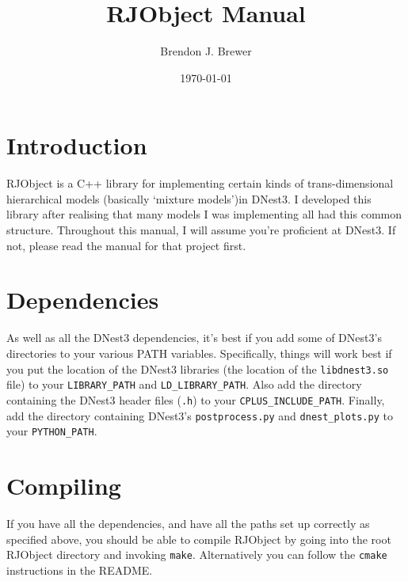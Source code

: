\documentclass[a4paper, 11pt]{article}
\title{RJObject Manual}
\author{Brendon J. Brewer}
\date{\today}
\begin{document}
\maketitle

\section{Introduction}
RJObject is a C++ library for implementing certain kinds of trans-dimensional
hierarchical models (basically `mixture models')in DNest3. I developed this
library after realising that many models I was implementing all had this
common structure.
Throughout this manual, I will assume you're proficient at
DNest3. If not, please read the manual for that project first.

\section{Dependencies}
As well as all the DNest3 dependencies, it's best if you add some of DNest3's
directories to your various PATH variables. Specifically, things will work best
if you put the location of the DNest3 libraries (the location of
the {\tt libdnest3.so} file) to your {\tt LIBRARY\_PATH} and
{\tt LD\_LIBRARY\_PATH}. Also add the directory containing the DNest3 header
files ({\tt *.h}) to your {\tt CPLUS\_INCLUDE\_PATH}. Finally, add the
directory containing DNest3's {\tt postprocess.py} and {\tt dnest\_plots.py} to
your {\tt PYTHON\_PATH}.

\section{Compiling}
If you have all the dependencies, and have all the paths set up correctly as
specified above, you should be able to compile RJObject by going into the
root RJObject directory and invoking {\tt make}. Alternatively you can follow
the {\tt cmake} instructions in the README.
\end{document}
